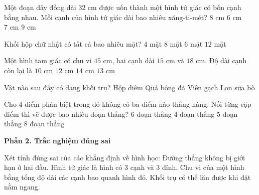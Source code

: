 \begin{ex} %
Một đoạn dây đồng dài $32\text{ cm}$ được uốn thành một hình tứ giác có bốn cạnh bằng nhau. Mỗi cạnh của hình tứ giác dài bao nhiêu xăng-ti-mét?
\choice
{\True $8\text{ cm}$}
{$6\text{ cm}$}
{$7\text{ cm}$}
{$9\text{ cm}$}
\end{ex}

\begin{ex} %
Khối hộp chữ nhật có tất cả bao nhiêu mặt?
\choice
{$4$ mặt}
{$8$ mặt}
{\True $6$ mặt}
{$12$ mặt}
\end{ex}

\begin{ex} %
Một hình tam giác có chu vi $45\text{ cm}$, hai cạnh dài $15\text{ cm}$ và $18\text{ cm}$. Độ dài cạnh còn lại là
\choice
{$10\text{ cm}$}
{\True $12\text{ cm}$}
{$14\text{ cm}$}
{$13\text{ cm}$}
\end{ex}

\begin{ex} %
Vật nào sau đây có dạng khối trụ?
\choice
{Hộp diêm}
{Quả bóng đá}
{Viên gạch}
{\True Lon sữa bò}
\end{ex}

\begin{ex} %
Cho $4$ điểm phân biệt trong đó không có ba điểm nào thẳng hàng. Nối từng cặp điểm thì vẽ được bao nhiêu đoạn thẳng?
\choice
{\True $6$ đoạn thẳng}
{$4$ đoạn thẳng}
{$5$ đoạn thẳng}
{$8$ đoạn thẳng}
\end{ex}

\textbf{Phần 2. Trắc nghiệm đúng sai}

\begin{ex} %
Xét tính đúng sai của các khẳng định về hình học:
\choiceTF
{\True Đường thẳng không bị giới hạn ở hai đầu.}
{Hình tứ giác là hình có 3 cạnh và 3 đỉnh.}
{\True Chu vi của một hình bằng tổng độ dài các cạnh bao quanh hình đó.}
{\True Khối trụ có thể lăn được khi đặt nằm ngang.}
\end{ex}

